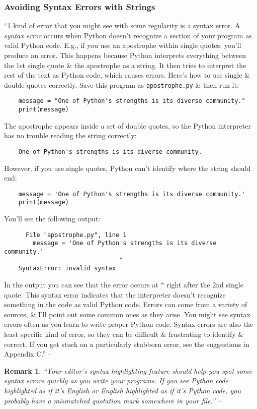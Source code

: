 \documentclass[oneside]{book}
\numberwithin{equation}{section}
\newtheorem{remark}{Remark}[chapter]
\begin{document}
\subsubsection{Avoiding Syntax Errors with Strings}
``1 kind of error that you might see with some regularity is a syntax error. A \textit{syntax error} occurs when Python doesn't recognize a section of your program as valid Python code. E.g., if you use an apostrophe within single quotes, you'll produce an error. This happens because Python interprets everything between the 1st single quote \& the apostrophe as a string. It then tries to interpret the rest of the text as Python code, which causes errors. Here's how to use single \& double quotes correctly. Save this program as \texttt{apostrophe.py} \& then run it:
\begin{verbatim}
	message = "One of Python's strengths is its diverse community."
	print(message)
\end{verbatim}
The apostrophe appears inside a set of double quotes, so the Python interpreter has no trouble reading the string correctly:
\begin{verbatim}
	One of Python's strengths is its diverse community.
\end{verbatim}
However, if you use single quotes, Python can't identify where the string should end:
\begin{verbatim}
	message = 'One of Python's strengths is its diverse community.'
	print(message)
\end{verbatim}
You'll see the following output:
\begin{verbatim}
	  File "apostrophe.py", line 1
	    message = 'One of Python's strengths is its diverse community.'
	                            ^
	SyntaxError: invalid syntax
\end{verbatim}
In the output you can see that the error occurs at \verb|^| right after the 2nd single quote. This syntax error indicates that the interpreter doesn't recognize something in the code as valid Python code. Errors can come from a variety of sources, \& I'll point out some common ones as they arise. You might see syntax errors often as you learn to write proper Python code. Syntax errors are also the least specific kind of error, so they can be difficult \& frustrating to identify \& correct. If you get stuck on a particularly stubborn error, see the suggestions in Appendix C.'' -- \cite[p. 24]{Matthes2019}

\begin{remark}
	``Your editor's syntax highlighting feature should help you spot some syntax errors quickly as you write your programs. If you see Python code highlighted as if it's English or English highlighted as if it's Python code, you probably have a mismatched quotation mark somewhere in your file.'' -- \cite[p. 25]{Matthes2019}
\end{remark}
\end{document}
